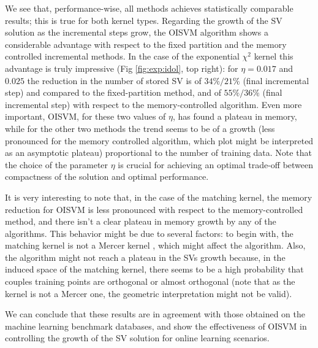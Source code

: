 We see that, performance-wise, all methods achieves statistically
comparable results; this is true for both kernel types. Regarding the
growth of the SV solution as the incremental steps grow, the OISVM
algorithm shows a considerable advantage with respect to the fixed
partition and the memory controlled incremental methods. In the case
of the exponential $\chi^{2}$ kernel this advantage is truly
impressive (Fig \ref{fig:exp:idol}, top right): for $\eta=0.017$ and
$0.025$ the reduction in the number of stored SV is of $34\%/21\%$
(final incremental step) and compared to the fixed-partition method,
and of $55\%/36\%$ (final incremental step) with respect to the
memory-controlled algorithm. Even more important, OISVM, for these two
values of $\eta$, has found a plateau in memory, while for the other
two methods the trend seems to be of a growth (less pronounced for the
memory controlled algorithm, which plot might be interpreted as an
asymptotic plateau) proportional to the number of training data. Note
that the choice of the parameter $\eta$ is crucial for achieving an
optimal trade-off between compactness of the solution and optimal
performance.

It is very interesting to note that, in the case of the matching
kernel, the memory reduction for OISVM is less pronounced with respect
to the memory-controlled method, and there isn't a clear plateau in
memory growth by any of the algorithms.  This behavior might be due to
several factors: to begin with, the matching kernel is not a Mercer
kernel \cite{fleuret:bmvc04}, which might affect the algorithm. Also,
the algorithm might not reach a plateau in the SVs growth because, in
the induced space of the matching kernel, there seems to be a high
probability that couples training points are orthogonal or almost
orthogonal (note that as the kernel is not a Mercer one, the geometric
interpretation might not be valid).

We can conclude that these results are in agreement with those
obtained on the machine learning benchmark databases, and show the
effectiveness of OISVM in controlling the growth of the SV solution
for online learning scenarios.

